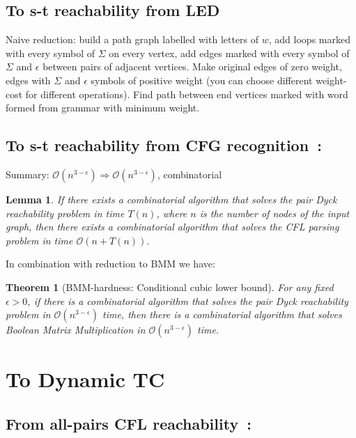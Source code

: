 \documentclass{amsart}
\newtheorem*{theorem}{Theorem}
\newtheorem*{lemma}{Lemma}
\begin{document}
	\subsection{To s-t reachability from LED}
	\label{cfl_to_led}
	
	Naive reduction: build a path graph labelled with letters of $w$, add loops marked with every symbol of $\Sigma$ on every vertex, add edges marked with every symbol of $\Sigma$ and $\epsilon$ between pairs of adjacent vertices. Make original edges of zero weight, edges with $\Sigma$ and $\epsilon$ symbols of positive weight (you can choose different weight-cost for different operations). Find path between end vertices marked with word formed from grammar with minimum weight.
	
	\subsection{To s-t reachability from CFG recognition~\cite{10.1145/3158118}:\\}
	\label{stcfl_to_cfg}
	
	Summary: $\mathcal{O}(n^{3 - \epsilon}) \Rightarrow \mathcal{O}(n^{3 - \epsilon})$, combinatorial
	
	\begin{lemma}
		If there exists a combinatorial algorithm that solves the pair Dyck reachability problem in time $T(n)$, where $n$ is the number of nodes of the input graph, then there exists a combinatorial
		algorithm that solves the CFL parsing problem in time $\mathcal{O}(n +T(n))$.
	\end{lemma}
	
	In combination with reduction to BMM we have:
	
	\begin{theorem}[BMM-hardness: Conditional cubic lower bound] 
		For any fixed $\epsilon > 0$, if there is a combinatorial algorithm that solves the pair Dyck reachability problem in $\mathcal{O}(n^{3 - \epsilon})$ time, then
		there is a combinatorial algorithm that solves Boolean Matrix Multiplication in $\mathcal{O}(n^{3 - \epsilon})$ time.
	\end{theorem}
	
	\section{To Dynamic TC}
	
	\subsection{From all-pairs CFL reachability~\cite{inbook}:\\}
	\label{dtc_to_cfl}
	
\end{document}
